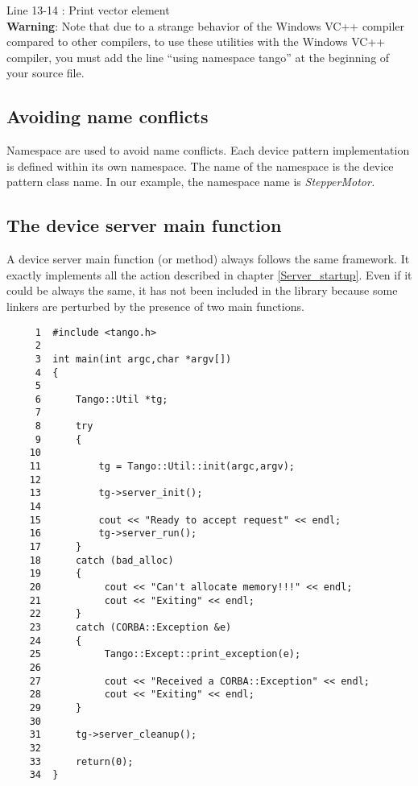 Line 13-14 : Print vector element\\


\textbf{Warning}: Note that due to a strange behavior of the Windows
VC++ compiler compared to other compilers, to use these utilities
with the Windows VC++ compiler, you must add the line ``using namespace
tango'' at the beginning of your source file.


\subsection{Avoiding name conflicts}

Namespace are used to avoid name conflicts. Each device pattern implementation
is defined within its own namespace. The name of
the namespace is the device pattern class name. In our example, the
namespace name is \emph{StepperMotor.}


\subsection{The device server main function}

A device server main function (or method) always follows
the same framework. It exactly implements all the action described
in chapter \ref{Server_startup}. Even if it could be always the same,
it has not been included in the library because some linkers are perturbed
by the presence of two main functions.




\begin{verbatim}
     1  #include <tango.h>
     2  
     3  int main(int argc,char *argv[])
     4  {
     5  
     6      Tango::Util *tg;
     7          
     8      try
     9      {
    10          
    11          tg = Tango::Util::init(argc,argv);
    12  
    13          tg->server_init();
    14  
    15          cout << "Ready to accept request" << endl;
    16          tg->server_run();
    17      }
    18      catch (bad_alloc)
    19      {
    20           cout << "Can't allocate memory!!!" << endl;
    21           cout << "Exiting" << endl;
    22      }
    23      catch (CORBA::Exception &e)
    24      {
    25           Tango::Except::print_exception(e);
    26                  
    27           cout << "Received a CORBA::Exception" << endl;
    28           cout << "Exiting" << endl;
    29      }
    30  
    31      tg->server_cleanup();
    32                  
    33      return(0);
    34  }
\end{verbatim}




